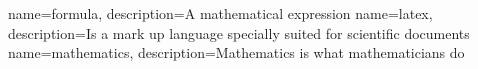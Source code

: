 \makeglossaries

{
        name=formula,
        description={A mathematical expression}
}
{
        name=latex,
        description={Is a mark up language specially suited for scientific documents}
}
{
        name=mathematics,
        description={Mathematics is what mathematicians do}
}
 
